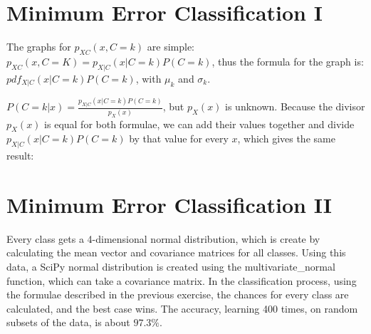 \documentclass{article}
\begin{document}
\inputminted{text}{knnb.txt}

\section{Minimum Error Classification I}
The graphs for $p_{XC}(x, C=k)$ are simple: $p_{XC}(x, C=K) =
p_{X|C}(x|C=k)P(C=k)$, thus the formula for the graph is: $pdf_{X|C}(x|C=k)
P(C=k)$, with $\mu_k$ and $\sigma_k$.

$P(C=k|x) = \frac{p_{X|C}(x|C=k)P(C=k)}{p_X(x)}$, but $p_X(x)$ is unknown.
Because the divisor $p_X(x)$ is equal for both formulae, we can add their values
together and divide $p_{X|C}(x|C=k)P(C=k)$ by that value for every $x$, which
gives the same result:



\section{Minimum Error Classification II}
Every class gets a 4-dimensional normal distribution, which is create by
calculating the mean vector and covariance matrices for all classes. Using this
data, a SciPy normal distribution is created using the multivariate\_normal
function, which can take a covariance matrix. In the classification process,
using the formulae described in the previous exercise, the chances for every
class are calculated, and the best case wins. The accuracy, learning 400 times,
on random subsets of the data, is about $97.3\%$.
\end{document}

